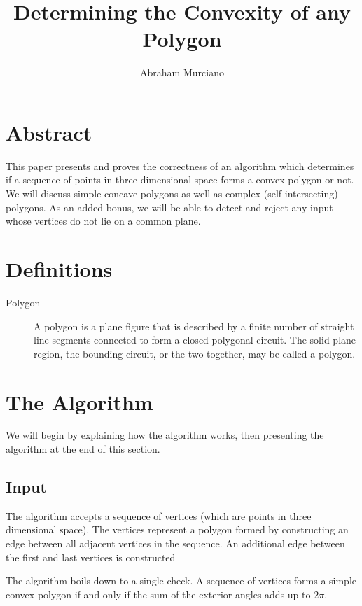 \documentclass{article}
\title{Determining the Convexity of any Polygon}
\author{Abraham Murciano}
\begin{document}
\maketitle

\section{Abstract}

This paper presents and proves the correctness of an algorithm which determines if a sequence of points in three dimensional space forms a convex polygon or not. We will discuss simple concave polygons as well as complex (self intersecting) polygons. As an added bonus, we will be able to detect and reject any input whose vertices do not lie on a common plane.

\section{Definitions}

\begin{description}
	\item[Polygon] A polygon is a plane figure that is described by a finite number of straight line segments connected to form a closed polygonal circuit. The solid plane region, the bounding circuit, or the two together, may be called a polygon.
\end{description}

\section{The Algorithm}

We will begin by explaining how the algorithm works, then presenting the algorithm at the end of this section.

\subsection{Input}

The algorithm accepts a sequence of vertices (which are points in three dimensional space). The vertices represent a polygon formed by constructing an edge between all adjacent vertices in the sequence. An additional edge between the first and last vertices is constructed

The algorithm boils down to a single check. A sequence of vertices forms a simple convex polygon if and only if the sum of the exterior angles adds up to \(2\pi\).
\end{document}
